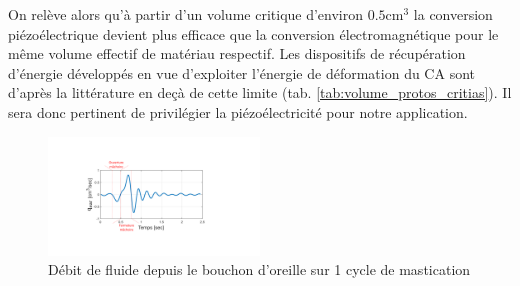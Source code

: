 On relève alors qu'à partir d'un volume critique d'environ $0.5$cm$^3$ la conversion piézoélectrique devient plus efficace que la conversion électromagnétique pour le même volume effectif de matériau respectif. Les dispositifs de récupération d'énergie développés en vue d'exploiter l'énergie de déformation du CA sont d'après la littérature en deçà de cette limite (tab. \ref{tab:volume_protos_critias}). Il sera donc pertinent de privilégier la piézoélectricité pour notre application.\\
\begin{table}[!htbp]
	\centering
	\captionsetup{justification=centering}
	\caption{Volume de matériau effectif pour les dispositifs développés pour l'exploitation de l'énergie dissipée par la mastication d'après la littérature}
	\label{tab:volume_protos_critias}
\end{table}
\begin{figure}[!htbp]
\begin{center}
    \captionsetup{justification=centering}
	\includegraphics[trim={6cm 3.5cm 8.5cm 3.5cm},clip,width=0.5\textwidth]{../Chap2/Figure/debit.pdf}
	\caption{Débit de fluide depuis le bouchon d'oreille sur 1 cycle de mastication \cite{Delnavaz2012}}
	\label{fig:debit_ear}
\end{center}
\end{figure}

